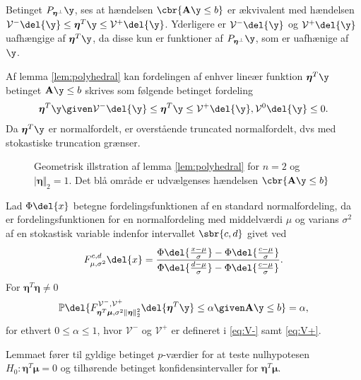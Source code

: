 Betinget \(P_{\boldsymbol{\eta}^\perp} \y\), ses at hændelsen \(\cbr{\mathbf{A} \y \leq b}\) er ækvivalent med hændelsen \(\mathcal{V}^- \del{\y} \leq \boldsymbol{\eta}^T \y \leq \mathcal{V}^+ \del{\y}\). Yderligere er \(\mathcal{V}^- \del{\y}\) og \(\mathcal{V}^+ \del{\y}\) uafhængige af \(\boldsymbol{\eta}^T \y\), da disse kun er funktioner af \(P_{\boldsymbol{\eta}^\perp} \y\), som er uafhænige af \(\y\).


Af lemma \ref{lem:polyhedral} kan fordelingen af enhver lineær funktion \(\boldsymbol{\eta}^T \y\) betinget \(\mathbf{A} \y \leq b\) skrives som følgende betinget fordeling
\begin{align*}
\boldsymbol{\eta}^T \y \given \mathcal{V}^- \del{\y} \leq \boldsymbol{\eta}^T \y \leq \mathcal{V}^+ \del{\y}, \mathcal{V}^0 \del{\y} \leq 0.
\end{align*}
Da \(\boldsymbol{\eta}^T \y\) er normalfordelt, er overstående truncated normalfordelt, dvs med stokastiske truncation grænser.

\begin{figure}[H]
\centering
\scalebox{1}{}
\caption{Geometrisk illstration af lemma \ref{lem:polyhedral} for \(n=2\) og \(\vert \boldsymbol{\eta} \Vert_2=1\). 
Det blå område er udvælgenses hændelsen \(\cbr{\mathbf{A} \y \leq b}\)}
\end{figure}


\begin{lem}  \label{lem:lem2}
Lad \(\Phi \del{x}\) betegne fordelingsfunktionen af en standard normalfordeling, da er fordelingsfunktionen for en normalfordeling med middelværdi \(\mu\) og varians \(\sigma^2\) af en stokastisk variable indenfor intervallet \(\sbr{c,d}\) givet ved
\begin{align*}
F_{\mu, \sigma^2}^{c,d} \del{x} = \frac{\Phi\del{\frac{x-\mu}{\sigma}} - \Phi\del{\frac{c-\mu}{\sigma}}}{\Phi\del{\frac{d-\mu}{\sigma}} - \Phi\del{\frac{c-\mu}{\sigma}}}.
\end{align*}
For \(\boldsymbol{\eta}^T \boldsymbol{\eta} \neq 0\)
\begin{align*}
\mathbb{P} \del{F_{\boldsymbol{\eta}^T \boldsymbol{\mu}, \sigma^2 \Vert \boldsymbol{\eta} \Vert_2^2}^{\mathcal{V}^-, \mathcal{V}^+} \del{\boldsymbol{\eta}^T \y} \leq \alpha \given \mathbf{A} \y \leq b} = \alpha, 
\end{align*}
for ethvert \(0 \leq \alpha \leq 1\), hvor \(\mathcal{V}^-\) og \(\mathcal{V}^+\) er defineret i \eqref{eq:V-} samt \eqref{eq:V+}. 
\end{lem}
%
Lemmaet fører til gyldige betinget \(p\)-værdier for at teste nulhypotesen \(H_0: \boldsymbol{\eta}^T \boldsymbol{\mu}=0\) og tilhørende betinget konfidensintervaller for \(\boldsymbol{\eta}^T \boldsymbol{\mu}\).

